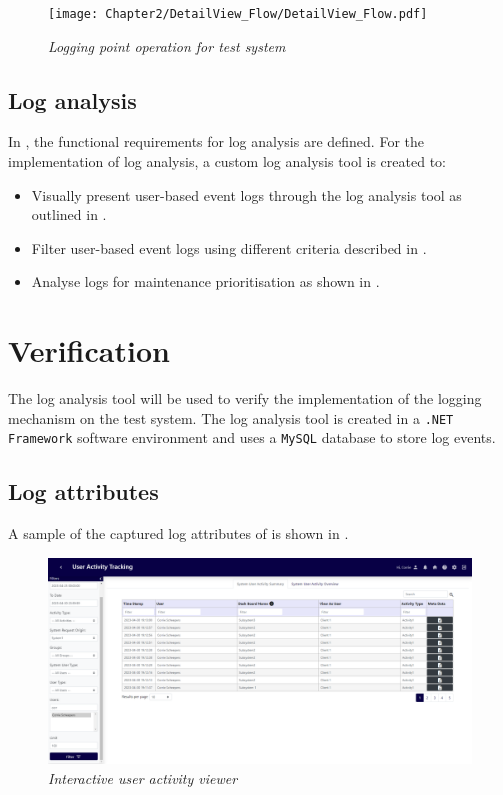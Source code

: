 \begin{figure}[!htb]
	\centering %
	\texttt{[image: Chapter2/DetailView\_Flow/DetailView\_Flow.pdf]}
	\caption[Logging point operation for test system]
	{\textit{Logging point operation for test system}}\label{fig:ch3_loggingProcess}
\end{figure}

\clearpage

\subsection{Log analysis}\label{sec:ch3_implementationLogAnalysis}
In , the functional requirements for log analysis are defined. For the implementation of log analysis, a custom log analysis tool is created to:

\begin{itemize}
	\item Visually present user-based event logs through the log analysis tool as outlined in .
	\item Filter user-based event logs using different criteria described in .
	\item Analyse logs for maintenance prioritisation as shown in .
\end{itemize}

\section{Verification}\label{sec:ch3_Verification}
The log analysis tool will be used to verify the implementation of the logging mechanism on the test system. The log analysis tool is created in a \texttt{.NET Framework} software environment and uses a \texttt{MySQL} database to store log events.

\subsection{Log attributes}
A sample of the captured log attributes of  is shown in .

\begin{figure}[!htb]
	\centering %
	\includegraphics[width=0.99\linewidth]{img/ch3/analysis/UAT_menu.png}
	\caption[Interactive user activity viewer]
	{\textit{Interactive user activity viewer}}\label{fig:ch3_UAT_menu}
\end{figure}

